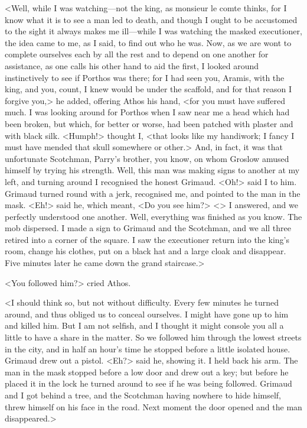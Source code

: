 <Well, while I was watching—not the king, as monsieur le comte thinks, for I know what it is to see a man led to death, and though I ought to be accustomed to the sight it always makes me ill—while I was watching the masked executioner, the idea came to me, as I said, to find out who he was. Now, as we are wont to complete ourselves each by all the rest and to depend on one another for assistance, as one calls his other hand to aid the first, I looked around instinctively to see if Porthos was there; for I had seen you, Aramis, with the king, and you, count, I knew would be under the scaffold, and for that reason I forgive you,> he added, offering Athos his hand, <for you must have suffered much. I was looking around for Porthos when I saw near me a head which had been broken, but which, for better or worse, had been patched with plaster and with black silk. <Humph!> thought I, <that looks like my handiwork; I fancy I must have mended that skull somewhere or other.> And, in fact, it was that unfortunate Scotchman, Parry's brother, you know, on whom Groslow amused himself by trying his strength. Well, this man was making signs to another at my left, and turning around I recognised the honest Grimaud. <Oh!> said I to him. Grimaud turned round with a jerk, recognised me, and pointed to the man in the mask. <Eh!> said he, which meant, <Do you see him?> <> I answered, and we perfectly understood one another. Well, everything was finished as you know. The mob dispersed. I made a sign to Grimaud and the Scotchman, and we all three retired into a corner of the square. I saw the executioner return into the king's room, change his clothes, put on a black hat and a large cloak and disappear. Five minutes later he came down the grand staircase.>

<You followed him?> cried Athos.

<I should think so, but not without difficulty. Every few minutes he turned around, and thus obliged us to conceal ourselves. I might have gone up to him and killed him. But I am not selfish, and I thought it might console you all a little to have a share in the matter. So we followed him through the lowest streets in the city, and in half an hour's time he stopped before a little isolated house. Grimaud drew out a pistol. <Eh?> said he, showing it. I held back his arm. The man in the mask stopped before a low door and drew out a key; but before he placed it in the lock he turned around to see if he was being followed. Grimaud and I got behind a tree, and the Scotchman having nowhere to hide himself, threw himself on his face in the road. Next moment the door opened and the man disappeared.>

